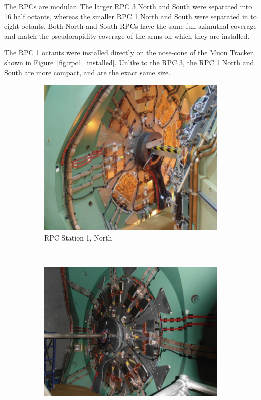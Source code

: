 The RPCs are modular. The larger RPC 3 North and South were separated
into 16 half octants, whereas the smaller RPC 1 North and South were separated
in to eight octants. Both North and South RPCs have the same full azimuthal
coverage and match the pseudorapidity coverage of the arms on which they are
installed.

The RPC 1 octants were installed directly on the nose-cone of the Muon Tracker,
shown in Figure~\ref{fig:rpc1_installed}. Unlike to the RPC 3, the RPC 1 North
and South are more compact, and are the exact same size.

\begin{figure}
  \centering
  \begin{subfigure}[b]{0.5\textwidth}
    \centering
    \includegraphics[width=\linewidth]{./figures/rpc1_north_installed}
    \caption{RPC Station 1, North}
    \label{fig:rpc1n}
  \end{subfigure}%
  ~
  \begin{subfigure}[b]{0.5\textwidth}
    \centering
    \includegraphics[width=\linewidth]{./figures/rpc1_south_installed}

\end{subfigure}
\end{figure}
